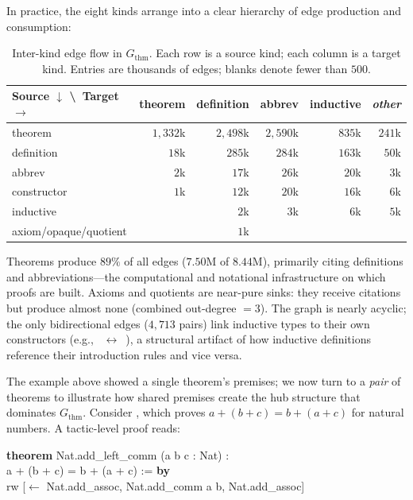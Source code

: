 \noindent
In practice, the eight kinds arrange into a clear hierarchy of edge production and consumption:

\begin{table}[H]
\centering
\caption{Inter-kind edge flow in $G_{\mathrm{thm}}$. Each row is a source kind; each column is a target kind. Entries are thousands of edges; blanks denote fewer than $500$.}
\label{tab:inter-kind-flow}
\small
\begin{tabular}{l*{5}{r}}
\toprule
Source $\downarrow$ \textbackslash\ Target $\rightarrow$ & theorem & definition & abbrev & inductive & \textit{other} \\
\midrule
theorem      & $1{,}332$k & $2{,}498$k & $2{,}590$k & $835$k & $241$k \\
definition   & $18$k      & $285$k     & $284$k     & $163$k & $50$k \\
abbrev       & $2$k       & $17$k      & $26$k      & $20$k  & $3$k \\
constructor  & $1$k       & $12$k      & $20$k      & $16$k  & $6$k \\
inductive    &            & $2$k       & $3$k       & $6$k   & $5$k \\
axiom/opaque/quotient &   & $1$k       &            &        & \\
\bottomrule
\end{tabular}
\end{table}

\noindent
Theorems produce $89\%$ of all edges ($7.50$M of $8.44$M), primarily citing definitions and abbreviations---the computational and notational infrastructure on which proofs are built. Axioms and quotients are near-pure sinks: they receive citations but produce almost none (combined out-degree $= 3$). The graph is nearly acyclic; the only bidirectional edges ($4{,}713$ pairs) link inductive types to their own constructors (e.g., ~$\leftrightarrow$~), a structural artifact of how inductive definitions reference their introduction rules and vice versa.

\medskip
\noindent
The  example above showed a single theorem's premises; we now turn to a \emph{pair} of theorems to illustrate how shared premises create the hub structure that dominates $G_{\mathrm{thm}}$. Consider , which proves $a + (b + c) = b + (a + c)$ for natural numbers. A tactic-level proof reads:

\begin{codebox}
\textbf{theorem} \textcolor{red!70!black}{Nat.add\_left\_comm} (a b c : Nat) :\\
\hspace{2em}a + (b + c) = b + (a + c) := \textbf{by}\\
\hspace{1.5em}rw [$\leftarrow$ \textcolor{red!70!black}{Nat.add\_assoc}, \textcolor{red!70!black}{Nat.add\_comm} a b, \textcolor{red!70!black}{Nat.add\_assoc}]
\end{codebox}

